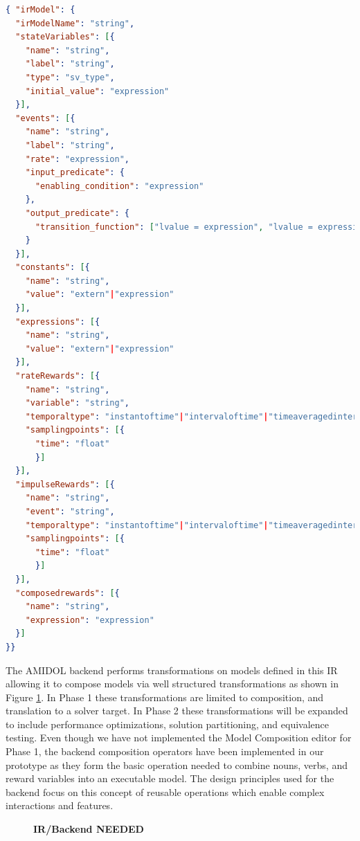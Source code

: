\documentclass[11pt]{article}
\newcommand{\amidol}{\textsc{AMIDOL}}
\begin{document}
\begin{lstlisting}[language=json, caption=JSON Schema for the AMIDOL Intermediate Representation]
{ "irModel": {
  "irModelName": "string",
  "stateVariables": [{
    "name": "string",
    "label": "string",
    "type": "sv_type",
    "initial_value": "expression"
  }],
  "events": [{
    "name": "string",
    "label": "string",
    "rate": "expression",
    "input_predicate": {
      "enabling_condition": "expression"
    },
    "output_predicate": {
      "transition_function": ["lvalue = expression", "lvalue = expression", ...]
    }
  }],
  "constants": [{
    "name": "string",
    "value": "extern"|"expression"
  }],
  "expressions": [{
    "name": "string",
    "value": "extern"|"expression"
  }],
  "rateRewards": [{
    "name": "string",
    "variable": "string",
    "temporaltype": "instantoftime"|"intervaloftime"|"timeaveragedintervaloftime"|"steadystate",
    "samplingpoints": [{
      "time": "float"
      }]    
  }],
  "impulseRewards": [{
    "name": "string",
    "event": "string",
    "temporaltype": "instantoftime"|"intervaloftime"|"timeaveragedintervaloftime"|"steadystate",
    "samplingpoints": [{
      "time": "float"
      }]    
  }],
  "composedrewards": [{
    "name": "string",
    "expression": "expression"
  }]
}}
\end{lstlisting}

The \amidol{} backend performs transformations on models defined in this IR allowing it to compose models via well structured transformations as shown in Figure \ref{Fig:AMIDOLBackend}.  In Phase 1 these transformations are limited to composition, and translation to a solver target.  In Phase 2 these transformations will be expanded to include performance optimizations, solution partitioning, and equivalence testing.  Even though we have not implemented the Model Composition editor for Phase 1, the backend composition operators have been implemented in our prototype as they form the basic operation needed to combine nouns, verbs, and reward variables into an executable model.  The design principles used for the backend focus on this concept of reusable operations which enable complex interactions and features.

\begin{figure}
  \begin{center}\textbf{IR/Backend NEEDED}\end{center}
  \caption{}
  \label{Fig:AMIDOLBackend}
\end{figure}
\end{document}
